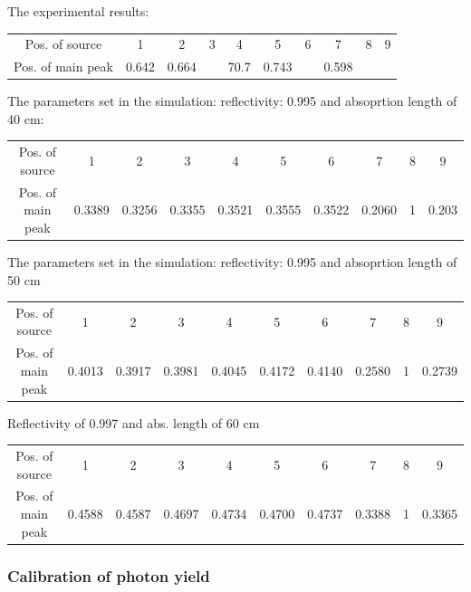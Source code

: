 \documentclass[12pt, a4paper,titlepage]{article}
\numberwithin{equation}{section}
\numberwithin{figure}{section}
\begin{document}
The experimental results:

\begin{center}
\begin{tabular}{ |c|c|c|c|c|c|c|c|c|c| } 
 \hline
  Pos. of source & 1 & 2 & 3 & 4 & 5 & 6 & 7 & 8 & 9 \\ 
  Pos. of main peak & 0.642 & 0.664 & & 70.7 & 0.743 & & 0.598 & &  \\ 
 \hline
\end{tabular}
\end{center}

The parameters set in the simulation: reflectivity: 0.995 and absoprtion length of
40 cm:

\begin{center}
\begin{tabular}{ |c|c|c|c|c|c|c|c|c|c| } 
 \hline
  Pos. of source & 1 & 2 & 3 & 4 & 5 & 6 & 7 & 8 & 9 \\ 
  Pos. of main peak & 0.3389 & 0.3256 & 0.3355 & 0.3521 & 0.3555 & 0.3522 & 0.2060 & 1 & 0.203  \\ 
 \hline
\end{tabular}
\end{center}


The parameters set in the simulation: reflectivity: 0.995 and absoprtion length of 50 cm

\begin{center}
\begin{tabular}{ |c|c|c|c|c|c|c|c|c|c| } 
 \hline
 Pos. of source & 1 & 2 & 3 & 4 & 5 & 6 & 7 & 8 & 9 \\ 
 Pos. of main peak & 0.4013 & 0.3917 & 0.3981 & 0.4045 & 0.4172 & 0.4140 & 0.2580 & 1 & 0.2739\\ 
 \hline
\end{tabular}
\end{center}

Reflectivity of 0.997 and abs. length of 60 cm

\begin{center}
\begin{tabular}{ |c|c|c|c|c|c|c|c|c|c| } 
 \hline
  Pos. of source & 1 & 2 & 3 & 4 & 5 & 6 & 7 & 8 & 9 \\ 
  Pos. of main peak & 0.4588 & 0.4587 & 0.4697 & 0.4734 & 0.4700 & 0.4737 & 0.3388 & 1 & 0.3365  \\ 
 \hline
\end{tabular}
\end{center}

\pagebreak

\subsubsection{Calibration of photon yield}
\end{document}
